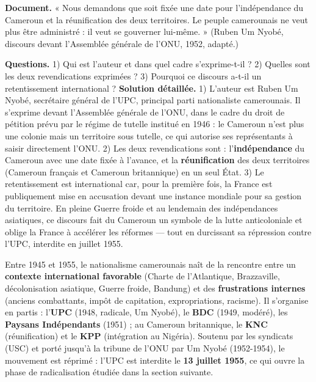 \documentclass[11pt]{article}
\begin{document}
\begin{exoresolu}
\textbf{Document.} « Nous demandons que soit fixée une date pour l'indépendance du Cameroun et la réunification des deux territoires. Le peuple camerounais ne veut plus être administré : il veut se gouverner lui-même. » (Ruben Um Nyobé, discours devant l'Assemblée générale de l'ONU, 1952, adapté.)

\textbf{Questions.} 1) Qui est l'auteur et dans quel cadre s'exprime-t-il ? 2) Quelles sont les deux revendications exprimées ? 3) Pourquoi ce discours a-t-il un retentissement international ?
\tcblower
\textbf{Solution détaillée.}
1) L'auteur est Ruben Um Nyobé, secrétaire général de l'UPC, principal parti nationaliste camerounais. Il s'exprime devant l'Assemblée générale de l'ONU, dans le cadre du droit de pétition prévu par le régime de tutelle institué en 1946 : le Cameroun n'est plus une colonie mais un territoire sous tutelle, ce qui autorise ses représentants à saisir directement l'ONU.
2) Les deux revendications sont : l'\textbf{indépendance} du Cameroun avec une date fixée à l'avance, et la \textbf{réunification} des deux territoires (Cameroun français et Cameroun britannique) en un seul État.
3) Le retentissement est international car, pour la première fois, la France est publiquement mise en accusation devant une instance mondiale pour sa gestion du territoire. En pleine Guerre froide et au lendemain des indépendances asiatiques, ce discours fait du Cameroun un symbole de la lutte anticoloniale et oblige la France à accélérer les réformes — tout en durcissant sa répression contre l'UPC, interdite en juillet 1955.
\end{exoresolu}

\begin{aretenir}
Entre 1945 et 1955, le nationalisme camerounais naît de la rencontre entre un \textbf{contexte international favorable} (Charte de l'Atlantique, Brazzaville, décolonisation asiatique, Guerre froide, Bandung) et des \textbf{frustrations internes} (anciens combattants, impôt de capitation, expropriations, racisme). Il s'organise en partis : l'\textbf{UPC} (1948, radicale, Um Nyobé), le \textbf{BDC} (1949, modéré), les \textbf{Paysans Indépendants} (1951) ; au Cameroun britannique, le \textbf{KNC} (réunification) et le \textbf{KPP} (intégration au Nigéria). Soutenu par les syndicats (USC) et porté jusqu'à la tribune de l'ONU par Um Nyobé (1952-1954), le mouvement est réprimé : l'UPC est interdite le \textbf{13 juillet 1955}, ce qui ouvre la phase de radicalisation étudiée dans la section suivante.
\end{aretenir}
\end{document}
